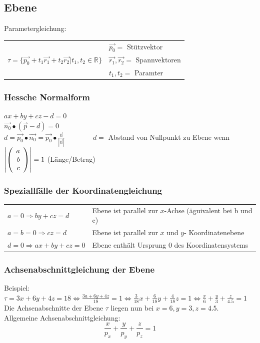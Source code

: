 \subsection{Ebene}
	Parametergleichung: \begin{tabular}{ll}
		& $\vec{p_0} =$ Stützvektor\\
		$\tau = \lbrace\vec{p_0} + t_1\vec{r_1} + t_2\vec{r_2} | t_1, t_2 \in \mathbb{R}\rbrace$ & $\vec{r_1}, \vec{r_2} =$ Spannvektoren \\
		& $t_1, t_2 =$ Paramter
	\end{tabular}

	\subsubsection{Hessche Normalform}
		$ax + by + cz - d = 0$\\
		$\vec{n_0} \bullet (\vec{p} - d) = 0$\\
		$d = \vec{p_0} \bullet \vec{n_0} = \vec{p_0} \bullet \frac{\vec{n}}{|\vec{n}|} \qquad \qquad
		d = $ Abstand von Nullpunkt zu Ebene wenn $\left|\left(\begin{array}{r} a \\ b \\ c \\ \end{array}\right)\right| = 1$ (Länge/Betrag)

	\subsubsection{Speziallfälle der Koordinatengleichung}
		\begin{tabular}{ll}
			$a = 0 \Rightarrow by + cz = d$ & Ebene ist parallel zur $x$-Achse (äguivalent bei b und c)\\
			$a = b = 0 \Rightarrow cz = d$ & Ebene ist parallel zur $x$ und $y$- Koordinatenebene\\
			$d = 0 \Rightarrow ax + by + cz = 0$ & Ebene enthält Ursprung 0 des Koordinatensystems
		\end{tabular}

	\subsubsection{Achsenabschnittgleichung der Ebene}
		Beispiel: $\tau = 3x + 6y + 4z = 18 \Leftrightarrow \frac{3a + 6y + 4z}{18} = 1 \Leftrightarrow \frac{3}{18}x + \frac{6}{18}y + \frac{4}{18}z = 1
		\Leftrightarrow \frac{x}{6} + \frac{y}{3} + \frac{z}{4.5} = 1$\\
		Die Achsenabschnitte der Ebene $\tau$ liegen nun bei $x = 6, y = 3, z = 4.5$.\\
		Allgemeine Achsenabschnittgleichung: $$ \frac{x}{p_x} + \frac{y}{p_y} + \frac{z}{p_z} = 1$$

